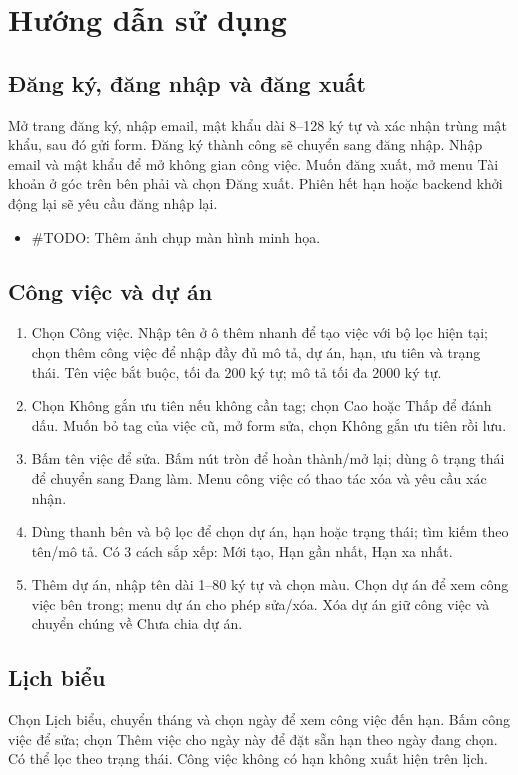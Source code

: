 \section{Hướng dẫn sử dụng}

\subsection{Đăng ký, đăng nhập và đăng xuất}
Mở trang đăng ký, nhập email, mật khẩu dài 8--128 ký tự và xác nhận trùng mật khẩu,
sau đó gửi form. Đăng ký thành công sẽ chuyển sang đăng nhập.
Nhập email và mật khẩu để mở không gian công việc.
Muốn đăng xuất, mở menu Tài khoản ở góc trên bên phải và chọn Đăng xuất.
Phiên hết hạn hoặc backend khởi động lại sẽ yêu cầu đăng nhập lại.
\begin{itemize}
  \item \#TODO: Thêm ảnh chụp màn hình minh họa.
\end{itemize}

\subsection{Công việc và dự án}
\begin{enumerate}
  \item Chọn Công việc. Nhập tên ở ô thêm nhanh để tạo việc với bộ lọc hiện tại;
  chọn thêm công việc để nhập đầy đủ mô tả, dự án, hạn, ưu tiên và trạng thái.
  Tên việc bắt buộc, tối đa 200 ký tự; mô tả tối đa 2000 ký tự.
  \item Chọn Không gắn ưu tiên nếu không cần tag; chọn Cao hoặc Thấp để đánh dấu.
  Muốn bỏ tag của việc cũ, mở form sửa, chọn Không gắn ưu tiên rồi lưu.
  \item Bấm tên việc để sửa. Bấm nút tròn để hoàn thành/mở lại;
  dùng ô trạng thái để chuyển sang Đang làm. Menu công việc có thao tác xóa và yêu cầu xác nhận.
  \item Dùng thanh bên và bộ lọc để chọn dự án, hạn hoặc trạng thái;
  tìm kiếm theo tên/mô tả. Có 3 cách sắp xếp: Mới tạo, Hạn gần nhất, Hạn xa nhất.
  \item Thêm dự án, nhập tên dài 1--80 ký tự và chọn màu.
  Chọn dự án để xem công việc bên trong; menu dự án cho phép sửa/xóa.
  Xóa dự án giữ công việc và chuyển chúng về Chưa chia dự án.
\end{enumerate}

\subsection{Lịch biểu}
Chọn Lịch biểu, chuyển tháng và chọn ngày để xem công việc đến hạn.
Bấm công việc để sửa; chọn Thêm việc cho ngày này để đặt sẵn hạn theo ngày đang chọn.
Có thể lọc theo trạng thái. Công việc không có hạn không xuất hiện trên lịch.

